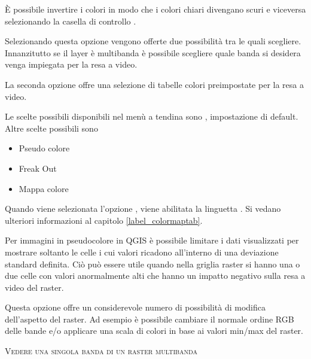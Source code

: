 È possibile invertire i colori in modo che i colori chiari divengano scuri e
viceversa selezionando la casella di controllo .


Selezionando questa opzione vengono offerte due possibilità tra le quali
scegliere. Innanzitutto se il layer è multibanda è possibile scegliere quale
banda si desidera venga impiegata per la resa a video. 

La seconda opzione offre una selezione di tabelle colori preimpostate per la
resa a video.

Le scelte possibili disponibili nel menù a tendina sono
, impostazione di default.
Altre scelte possibili sono
\begin{itemize}
\item Pseudo colore
\item Freak Out
\item Mappa colore
\end{itemize}

Quando viene selezionata l'opzione ,
viene abilitata la linguetta . Si vedano ulteriori
informazioni al capitolo \ref{label_colormaptab}.

Per immagini in pseudocolore in QGIS è possibile limitare i dati visualizzati
per mostrare soltanto le celle i cui valori ricadono all'interno di una deviazione standard
definita. Ciò può essere utile quando
nella griglia raster si hanno una o due celle con valori anormalmente alti
che hanno un impatto negativo sulla resa a video del raster.


Questa opzione offre un considerevole numero di possibilità di modifica
dell'aspetto del raster. Ad esempio è possibile cambiare il normale ordine RGB
delle bande e/o applicare una scala di colori in base ai valori min/max del
raster.

\begin{Tip}\caption{\textsc{Vedere una singola banda di un raster multibanda}}
\end{Tip} 

